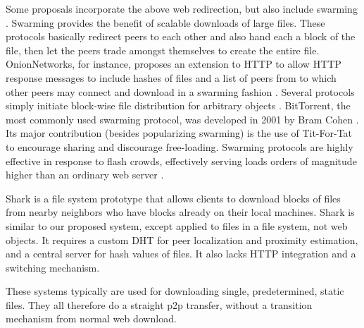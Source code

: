 Some proposals incorporate the above web redirection, but also include swarming \cite{overhaul, webtorrent, onion}.  Swarming provides the benefit of scalable downloads of large files.  These protocols basically redirect peers to each other and also hand each a block of the file, then let the peers trade amongst themselves to create the entire file.  
OnionNetworks, for instance, proposes an extension to HTTP to allow HTTP response messages to include hashes of files and a list of peers from to which other peers may connect and download in a swarming fashion \cite{onion}.  
Several protocols simply initiate block-wise file distribution for arbitrary objects \cite{zappala, cohen, slurpie, mutualcast, fastreplica, avalanche, bullet_prime}.  BitTorrent, the most commonly used swarming protocol, was developed in 2001 by Bram Cohen \cite{cohen}.  Its major contribution (besides popularizing swarming) is the use of Tit-For-Tat to encourage sharing and discourage free-loading.  Swarming protocols are highly effective in response to flash crowds, effectively serving loads orders of magnitude higher than an ordinary web server \cite{zappala}.

Shark \cite{shark} is a file system prototype that allows clients to download blocks of files from nearby neighbors who have blocks already on their local machines. 
Shark is similar to our proposed system, except applied to files in a file system, not web objects.  It  requires a custom DHT for peer localization and proximity estimation, and a central server for hash values of files.  It also lacks HTTP integration and a switching mechanism.

These systems typically are used for downloading single, predetermined, static files.  They all therefore do a straight p2p transfer, without a transition mechanism from normal web download.

